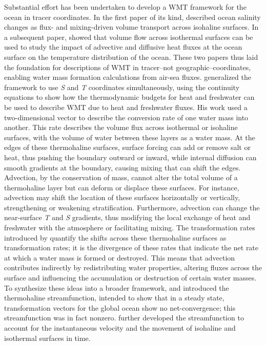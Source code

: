\documentclass[draft]{agujournal2019}
\begin{document}
Substantial effort has been undertaken to develop a WMT framework for the ocean in tracer coordinates. In the first paper of its kind,  described ocean salinity changes as flux- and mixing-driven volume transport across isohaline surfaces. In a subsequent paper,  showed that volume flow across isothermal surfaces can be used to study the impact of advective and diffusive heat fluxes at the ocean surface on the temperature distribution of the ocean. These two papers thus laid the foundation for descriptions of WMT in tracer--not geographic--coordinates, enabling water mass formation calculations from air-sea fluxes.  generalized the  framework to use \emph{S} and \emph{T} coordinates simultaneously, using the continuity equations to show how the thermodynamic budgets for heat and freshwater can be used to describe WMT due to heat and freshwater fluxes. His work used a two-dimensional vector to describe the conversion rate of one water mass into another. This rate describes the volume flux across isothermal or isohaline surfaces, with the volume of water between these layers as a water mass. At the edges of these thermohaline surfaces, surface forcing can add or remove salt or heat, thus pushing the boundary outward or inward, while internal diffusion can smooth gradients at the boundary, causing mixing that can shift the edges. Advection, by the conservation of mass, cannot alter the total volume of a thermohaline layer but can deform or displace these surfaces. For instance, advection may shift the location of these surfaces horizontally or vertically, strengthening or weakening stratification. Furthermore, advection can change the near-surface \emph{T} and \emph{S} gradients, thus modifying the local exchange of heat and freshwater with the atmosphere or facilitating mixing. The transformation rates introduced by  quantify the shifts across these thermohaline surfaces as transformation rates; it is the divergence of these rates that indicate the net rate at which a water mass is formed or destroyed. This means that advection contributes indirectly by redistributing water properties, altering fluxes across the surface and influencing the accumulation or destruction of certain water masses. To synthesize these ideas into a broader framework,  and  introduced the thermohaline streamfunction, intended to show that in a steady state, transformation vectors for the global ocean show no net-convergence; this streamfunction was in fact nonzero.  further developed the streamfunction to account for the instantaneous velocity and the movement of isohaline and isothermal surfaces in time. 
\end{document}
